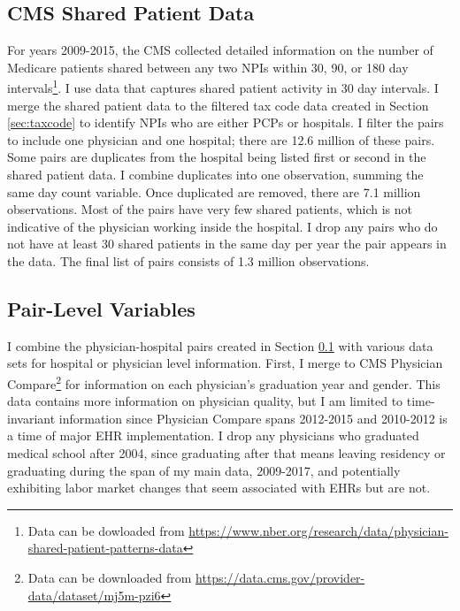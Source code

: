 \documentclass[11pt]{article}
\begin{document}
\subsection{CMS Shared Patient Data}\label{sec:sharedpat}

For years 2009-2015, the CMS collected detailed information on the number of Medicare patients shared between any two NPIs within 30, 90, or 180 day intervals\footnote{Data can be dowloaded from \hyperlink{https://www.nber.org/research/data/physician-shared-patient-patterns-data}{https://www.nber.org/research/data/physician-shared-patient-patterns-data}}. I use data that captures shared patient activity in 30 day intervals. I merge the shared patient data to the filtered tax code data created in Section \ref{sec:taxcode} to identify NPIs who are either PCPs or hospitals. I filter the pairs to include one physician and one hospital; there are 12.6 million of these pairs. Some pairs are duplicates from the hospital being listed first or second in the shared patient data. I combine duplicates into one observation, summing the same day count variable. Once duplicated are removed, there are 7.1 million observations. Most of the pairs have very few shared patients, which is not indicative of the physician working inside the hospital. I drop any pairs who do not have at least 30 shared patients in the same day per year the pair appears in the data. The final list of pairs consists of 1.3 million observations. 

\subsection{Pair-Level Variables}

I combine the physician-hospital pairs created in Section \ref{sec:sharedpat} with various data sets for hospital or physician level information. First, I merge to CMS Physician Compare\footnote{Data can be downloaded from \hyperlink{https://data.cms.gov/provider-data/dataset/mj5m-pzi6}{https://data.cms.gov/provider-data/dataset/mj5m-pzi6}} for information on each physician's graduation year and gender. This data contains more information on physician quality, but I am limited to time-invariant information since Physician Compare spans 2012-2015 and 2010-2012 is a time of major EHR implementation. I drop any physicians who graduated medical school after 2004, since graduating after that means leaving residency or graduating during the span of my main data, 2009-2017, and potentially exhibiting labor market changes that seem associated with EHRs but are not. 
\end{document}
